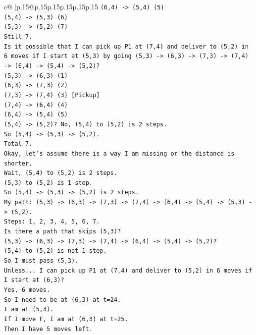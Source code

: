 \documentclass{article}
\begin{document}
{\begin{supertabular}{c@{$\;$}|p{.15\linewidth}@{}p{.15\linewidth}p{.15\linewidth}p{.15\linewidth}p{.15\linewidth}p{.15\linewidth}}
{{{\texttt{(6,4) {-}> (5,4) (5)} \\
\texttt{(5,4) {-}> (5,3) (6)} \\
\texttt{(5,3) {-}> (5,2) (7)} \\
\texttt{Still 7.} \\
\texttt{Is it possible that I can pick up P1 at (7,4) and deliver to (5,2) in 6 moves if I start at (5,3) by going (5,3) {-}> (6,3) {-}> (7,3) {-}> (7,4) {-}> (6,4) {-}> (5,4) {-}> (5,2)?} \\
\texttt{(5,3) {-}> (6,3) (1)} \\
\texttt{(6,3) {-}> (7,3) (2)} \\
\texttt{(7,3) {-}> (7,4) (3) {[}Pickup{]}} \\
\texttt{(7,4) {-}> (6,4) (4)} \\
\texttt{(6,4) {-}> (5,4) (5)} \\
\texttt{(5,4) {-}> (5,2)? No, (5,4) to (5,2) is 2 steps.} \\
\texttt{So (5,4) {-}> (5,3) {-}> (5,2).} \\
\texttt{Total 7.} \\
\texttt{Okay, let's assume there is a way I am missing or the distance is shorter.} \\
\texttt{Wait, (5,4) to (5,2) is 2 steps.} \\
\texttt{(5,3) to (5,2) is 1 step.} \\
\texttt{So (5,4) {-}> (5,3) {-}> (5,2) is 2 steps.} \\
\texttt{My path: (5,3) {-}> (6,3) {-}> (7,3) {-}> (7,4) {-}> (6,4) {-}> (5,4) {-}> (5,3) {-}> (5,2).} \\
\texttt{Steps: 1, 2, 3, 4, 5, 6, 7.} \\
\texttt{Is there a path that skips (5,3)?} \\
\texttt{(5,3) {-}> (6,3) {-}> (7,3) {-}> (7,4) {-}> (6,4) {-}> (5,4) {-}> (5,2)?} \\
\texttt{(5,4) to (5,2) is not 1 step.} \\
\texttt{So I must pass (5,3).} \\
\texttt{Unless... I can pick up P1 at (7,4) and deliver to (5,2) in 6 moves if I start at (6,3)?} \\
\texttt{Yes, 6 moves.} \\
\texttt{So I need to be at (6,3) at t=24.} \\
\texttt{I am at (5,3).} \\
\texttt{If I move F, I am at (6,3) at t=25.} \\
\texttt{Then I have 5 moves left.} \\
}}}
\end{supertabular}}
\end{document}
